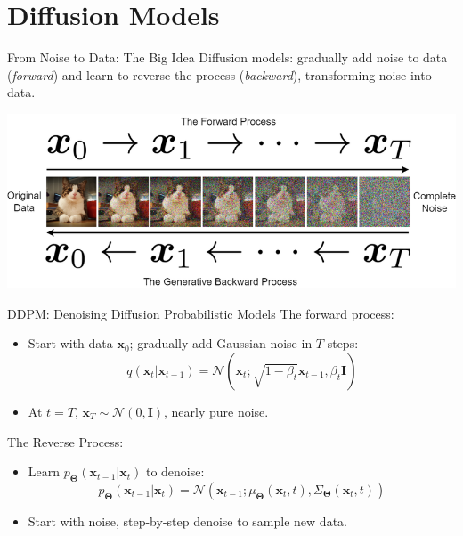 \documentclass{beamer}
\newcommand{\bs}[1]{\boldsymbol{#1}}
\begin{document}
\section{Diffusion Models}
\begin{frame}{From Noise to Data: The Big Idea}
   Diffusion models: gradually add noise to data (\emph{forward}) and learn to reverse the process (\emph{backward}), transforming noise into data.
   \begin{center}
    \includegraphics[width=\textwidth]{fig/diffusion_intro.png}
   \end{center}
\end{frame}

\begin{frame}{DDPM: Denoising Diffusion Probabilistic Models}
 The forward process:   
  \begin{itemize}
        \item Start with data \(\bs{x}_0\); gradually add Gaussian noise in \(T\) steps:
            \[
                q(\bs{x}_t | \bs{x}_{t-1}) = \mathcal{N}(\bs{x}_t; \sqrt{1-\beta_t}\bs{x}_{t-1}, \beta_t \bs{I})
            \]
        \item At \(t = T\), \(\bs{x}_T \sim \mathcal{N}(0, \bs{I})\), nearly pure noise.
    \end{itemize}\vspace{6mm}

The Reverse Process:
    \begin{itemize}
        \item Learn \(p_{\bs{\Theta}}(\bs{x}_{t-1} | \bs{x}_t)\) to denoise:
            \[
                p_{\bs{\Theta}}(\bs{x}_{t-1} | \bs{x}_t) = \mathcal{N}(\bs{x}_{t-1}; \mu_{\bs{\Theta}}(\bs{x}_t, t), \Sigma_{\bs{\Theta}}(\bs{x}_t, t))
            \]
        \item Start with noise, step-by-step denoise to sample new data.
    \end{itemize}
\end{frame}
\end{document}
